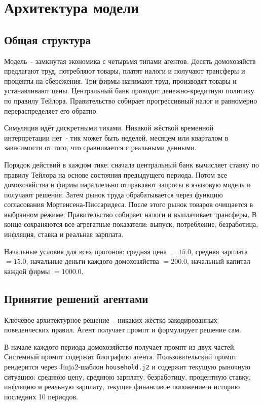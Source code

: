 \documentclass[12pt, a4paper]{article}
\begin{document}
\section{Архитектура модели}

\subsection{Общая структура}

Модель~- замкнутая экономика с четырьмя типами агентов. Десять домохозяйств предлагают труд, потребляют товары, платят налоги и получают трансферы и проценты на сбережения. Три фирмы нанимают труд, производят товары и устанавливают цены. Центральный банк проводит денежно-кредитную политику по правилу Тейлора. Правительство собирает прогрессивный налог и равномерно перераспределяет его обратно.

Симуляция идёт дискретными тиками. Никакой жёсткой временной интерпретации нет~- тик может быть неделей, месяцем или кварталом в зависимости от того, что сравнивается с реальными данными.

Порядок действий в каждом тике: сначала центральный банк вычисляет ставку по правилу Тейлора на основе состояния предыдущего периода. Потом все домохозяйства и фирмы параллельно отправляют запросы в языковую модель и получают решения. Затем рынок труда обрабатывается через функцию согласования Мортенсена-Писсаридеса. После этого рынок товаров очищается в выбранном режиме. Правительство собирает налоги и выплачивает трансферы. В конце сохраняются все агрегатные показатели: выпуск, потребление, безработица, инфляция, ставка и реальная зарплата.

Начальные условия для всех прогонов: средняя цена $= 15.0$, средняя зарплата $= 15.0$, начальные деньги каждого домохозяйства $= 200.0$, начальный капитал каждой фирмы $= 1000.0$.

\subsection{Принятие решений агентами}

Ключевое архитектурное решение~- никаких жёстко закодированных поведенческих правил. Агент получает промпт и формулирует решение сам.

В начале каждого периода домохозяйство получает промпт из двух частей. Системный промпт содержит биографию агента. Пользовательский промпт рендерится через Jinja2-шаблон \texttt{household.j2} и содержит текущую рыночную ситуацию: среднюю цену, среднюю зарплату, безработицу, процентную ставку, инфляцию и реальную зарплату, текущее финансовое положение и историю последних 10 периодов.
\end{document}
